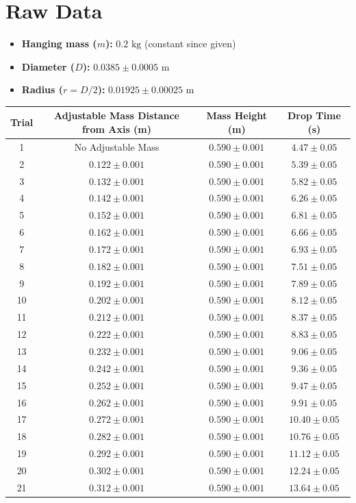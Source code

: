 \documentclass[11pt]{article}
\begin{document}
\section*{Raw Data}
\begin{itemize}[noitemsep]
    \item \textbf{Hanging mass ($m$):} $0.2\text{ kg}$ (constant since given)
    \item \textbf{Diameter ($D$):} $0.0385 \pm 0.0005\text{ m}$
    \item \textbf{Radius ($r = D/2$):} $0.01925 \pm 0.00025\text{ m}$
\end{itemize}

\begin{table}[h!]
\centering
\small
\begin{tabular}{cccc}
\toprule
\textbf{Trial} & \textbf{Adjustable Mass Distance from Axis (m)} & \textbf{Mass Height (m)} & \textbf{Drop Time (s)} \\
\midrule
1 & No Adjustable Mass & $0.590 \pm 0.001$ & $4.47 \pm 0.05$ \\
2 & $0.122 \pm 0.001$ & $0.590 \pm 0.001$ & $5.39 \pm 0.05$ \\
3 & $0.132 \pm 0.001$ & $0.590 \pm 0.001$ & $5.82 \pm 0.05$ \\
4 & $0.142 \pm 0.001$ & $0.590 \pm 0.001$ & $6.26 \pm 0.05$ \\
5 & $0.152 \pm 0.001$ & $0.590 \pm 0.001$ & $6.81 \pm 0.05$ \\
6 & $0.162 \pm 0.001$ & $0.590 \pm 0.001$ & $6.66 \pm 0.05$ \\
7 & $0.172 \pm 0.001$ & $0.590 \pm 0.001$ & $6.93 \pm 0.05$ \\
8 & $0.182 \pm 0.001$ & $0.590 \pm 0.001$ & $7.51 \pm 0.05$ \\
9 & $0.192 \pm 0.001$ & $0.590 \pm 0.001$ & $7.89 \pm 0.05$ \\
10 & $0.202 \pm 0.001$ & $0.590 \pm 0.001$ & $8.12 \pm 0.05$ \\
11 & $0.212 \pm 0.001$ & $0.590 \pm 0.001$ & $8.37 \pm 0.05$ \\
12 & $0.222 \pm 0.001$ & $0.590 \pm 0.001$ & $8.83 \pm 0.05$ \\
13 & $0.232 \pm 0.001$ & $0.590 \pm 0.001$ & $9.06 \pm 0.05$ \\
14 & $0.242 \pm 0.001$ & $0.590 \pm 0.001$ & $9.36 \pm 0.05$ \\
15 & $0.252 \pm 0.001$ & $0.590 \pm 0.001$ & $9.47 \pm 0.05$ \\
16 & $0.262 \pm 0.001$ & $0.590 \pm 0.001$ & $9.91 \pm 0.05$ \\
17 & $0.272 \pm 0.001$ & $0.590 \pm 0.001$ & $10.40 \pm 0.05$ \\
18 & $0.282 \pm 0.001$ & $0.590 \pm 0.001$ & $10.76 \pm 0.05$ \\
19 & $0.292 \pm 0.001$ & $0.590 \pm 0.001$ & $11.12 \pm 0.05$ \\
20 & $0.302 \pm 0.001$ & $0.590 \pm 0.001$ & $12.24 \pm 0.05$ \\
21 & $0.312 \pm 0.001$ & $0.590 \pm 0.001$ & $13.64 \pm 0.05$ \\
\bottomrule
\end{tabular}
\end{table}
\end{document}
